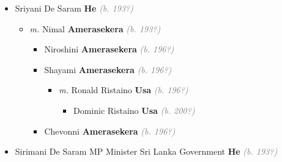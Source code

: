 \documentclass[10pt, openany]{book}
\begin{document}
\begin{itemize}
{\begin{itemize}
{\begin{itemize}
{\begin{itemize}
{\begin{itemize}
{\begin{itemize}
{\begin{itemize}
{\begin{itemize}
{\begin{itemize}
{\begin{itemize}
{  }
\item{Joshua Leonard \textbf{Usa} \textcolor{gray}{\textit{(b. 201?)}}
  }
\end{itemize}}
\end{itemize}
  }
\item{Leona Leonard \textbf{Usa} \textcolor{gray}{\textit{(b. 196?)}}
\begin{itemize}
\item{Sydney Leonard \textbf{UNKNOWN} \textcolor{gray}{\textit{(b. 200?)}}
  }
\end{itemize}
  }
\end{itemize}}
\end{itemize}
   }
\item{Sriyani De Saram \textbf{He} \textcolor{gray}{\textit{(b. 193?)}}
\begin{itemize}
\item{\textit{m.} Nimal \textbf{Amerasekera} \textcolor{gray}{\textit{(b. 193?)}}   \label{couple:00003530:00003531} \begin{itemize}
\item{Niroshini  \textbf{Amerasekera} \textcolor{gray}{\textit{(b. 196?)}}
 }
\item{Shayami  \textbf{Amerasekera} \textcolor{gray}{\textit{(b. 196?)}}
\begin{itemize}
\item{\textit{m.} Ronald Ristaino \textbf{Usa} \textcolor{gray}{\textit{(b. 196?)}}   \label{couple:00003534:00003535} \begin{itemize}
\item{Dominic Ristaino \textbf{Usa} \textcolor{gray}{\textit{(b. 200?)}}
  }
\end{itemize}}
\end{itemize}
 }
\item{Chevonni  \textbf{Amerasekera} \textcolor{gray}{\textit{(b. 196?)}}
 }
\end{itemize}}
\end{itemize}
   }
\item{Sirimani De Saram MP Minister Sri Lanka Government \textbf{He} \textcolor{gray}{\textit{(b. 193?)}}
}
\end{itemize}}
\end{itemize}}
\end{itemize}}
\end{itemize}}
\end{itemize}}
\end{itemize}
\end{document}
